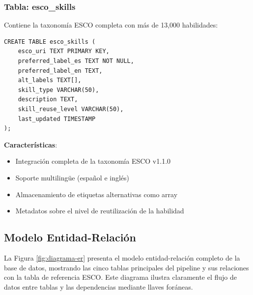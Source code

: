 \subsubsection{Tabla: esco\_skills}

Contiene la taxonomía ESCO completa con más de 13,000 habilidades:

\begin{verbatim}
CREATE TABLE esco_skills (
    esco_uri TEXT PRIMARY KEY,
    preferred_label_es TEXT NOT NULL,
    preferred_label_en TEXT,
    alt_labels TEXT[],
    skill_type VARCHAR(50),
    description TEXT,
    skill_reuse_level VARCHAR(50),
    last_updated TIMESTAMP
);
\end{verbatim}

\textbf{Características}:
\begin{itemize}
    \item Integración completa de la taxonomía ESCO v1.1.0
    \item Soporte multilingüe (español e inglés)
    \item Almacenamiento de etiquetas alternativas como array
    \item Metadatos sobre el nivel de reutilización de la habilidad
\end{itemize}

\subsection{Modelo Entidad-Relación}

La Figura \ref{fig:diagrama-er} presenta el modelo entidad-relación completo de la base de datos, mostrando las cinco tablas principales del pipeline y sus relaciones con la tabla de referencia ESCO. Este diagrama ilustra claramente el flujo de datos entre tablas y las dependencias mediante llaves foráneas.

